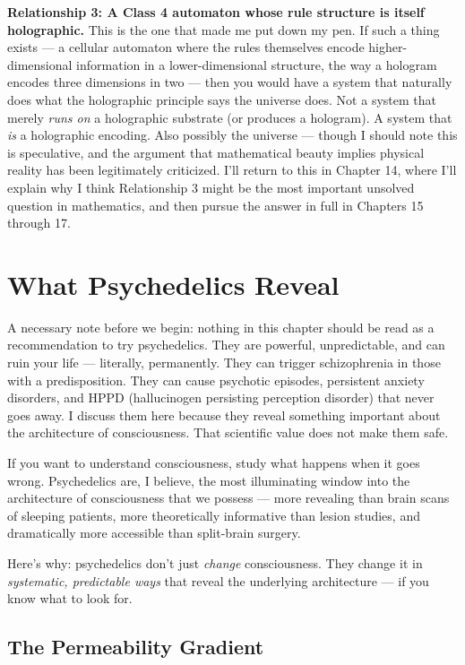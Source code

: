 \documentclass[11pt, twoside, openright]{book}
\begin{document}
\textbf{Relationship 3: A Class 4 automaton whose rule structure is itself holographic.} This is the one that made me put down my pen. If such a thing exists --- a cellular automaton where the rules themselves encode higher-dimensional information in a lower-dimensional structure, the way a hologram encodes three dimensions in two --- then you would have a system that naturally does what the holographic principle says the universe does. Not a system that merely \textit{runs on} a holographic substrate (or produces a hologram). A system that \textit{is} a holographic encoding. Also possibly the universe --- though I should note this is speculative, and the argument that mathematical beauty implies physical reality has been legitimately criticized. I'll return to this in Chapter 14, where I'll explain why I think Relationship 3 might be the most important unsolved question in mathematics, and then pursue the answer in full in Chapters 15 through 17.


\chapter{What Psychedelics Reveal}

A necessary note before we begin: nothing in this chapter should be read as a recommendation to try psychedelics. They are powerful, unpredictable, and can ruin your life --- literally, permanently. They can trigger schizophrenia in those with a predisposition. They can cause psychotic episodes, persistent anxiety disorders, and HPPD (hallucinogen persisting perception disorder) that never goes away. I discuss them here because they reveal something important about the architecture of consciousness. That scientific value does not make them safe.

If you want to understand consciousness, study what happens when it goes wrong. Psychedelics are, I believe, the most illuminating window into the architecture of consciousness that we possess --- more revealing than brain scans of sleeping patients, more theoretically informative than lesion studies, and dramatically more accessible than split-brain surgery.

Here's why: psychedelics don't just \textit{change} consciousness. They change it in \textit{systematic, predictable ways} that reveal the underlying architecture --- if you know what to look for.

\section*{The Permeability Gradient}
\end{document}

